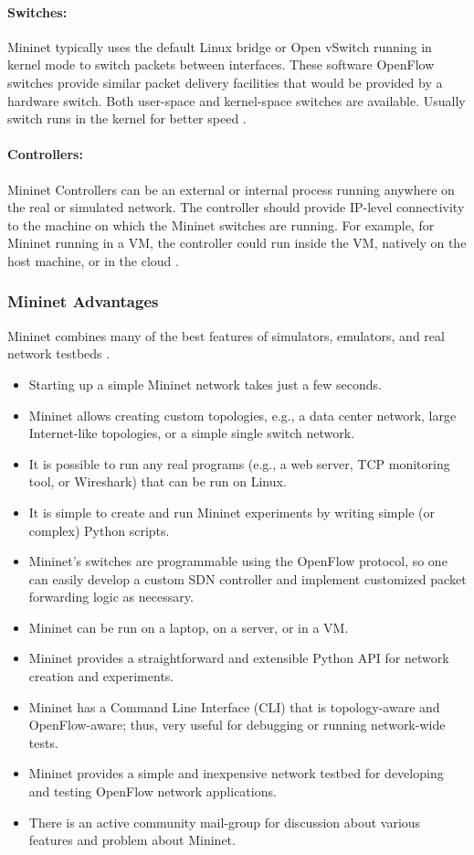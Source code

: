 \paragraph{Switches:}
Mininet typically uses the default Linux bridge or Open vSwitch running in kernel mode to switch packets between interfaces. These software OpenFlow switches provide similar packet delivery facilities that would be provided by a hardware switch. Both user-space and kernel-space switches are available. Usually switch runs in the kernel for better speed \cite{Handigol:2012:RNE:2413176.2413206}.

\paragraph{Controllers:}
Mininet Controllers can be an external or internal process running anywhere on the real or simulated network. The controller should provide IP-level connectivity to the machine on which the Mininet switches are running. For example, for Mininet running in a VM, the controller could run inside the VM, natively on the host machine, or in the cloud \cite{Handigol:2012:RNE:2413176.2413206}.

\subsubsection{Mininet Advantages}
Mininet combines many of the best features of simulators, emulators, and real network testbeds \cite{min-over}.
\begin{itemize}
	\item Starting up a simple Mininet network takes just a few seconds.
	\item Mininet allows creating custom topologies, e.g., a data center network, large Internet-like topologies, or a simple single switch network.
	\item It is possible to run any real programs (e.g., a web server, TCP monitoring tool, or Wireshark) that can be run on Linux.
	\item It is simple to create and run Mininet experiments by writing simple (or complex) Python scripts.
	\item Mininet's switches are programmable using the OpenFlow protocol, so one can easily develop a custom SDN controller and implement customized packet forwarding logic as necessary.
	\item Mininet can be run on a laptop, on a server, or in a VM.
	\item Mininet provides a straightforward and extensible Python API for network creation and experiments.
	\item Mininet has a Command Line Interface (CLI) that is topology-aware and OpenFlow-aware; thus, very useful for debugging or running network-wide tests.
	\item Mininet provides a simple and inexpensive network testbed for developing and testing OpenFlow network applications.
	\item There is an active community mail-group for discussion about various features and problem about Mininet.
\end{itemize}


